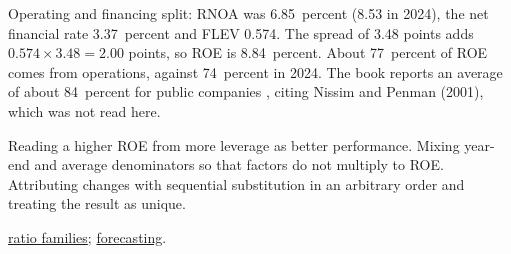 \begin{qfmethod}
Operating and financing split: RNOA was 6.85~percent (8.53 in 2024), the net financial rate 3.37~percent and FLEV 0.574. The spread of 3.48 points adds $0.574\times3.48=2.00$ points, so ROE is 8.84~percent. About 77~percent of ROE comes from operations, against 74~percent in 2024. The book reports an average of about 84~percent for public companies \citep[p.~465]{financial-statement-analysis-2009}, citing Nissim and Penman (2001), which was not read here.

 Reading a higher ROE from more leverage as better performance. Mixing year-end and average denominators so that factors do not multiply to ROE. Attributing changes with sequential substitution in an arbitrary order and treating the result as unique.

 \hyperref[meth:financial-ratio-families]{ratio families}; \hyperref[meth:ratio-based-earnings-forecast]{forecasting}.

\end{qfmethod}

